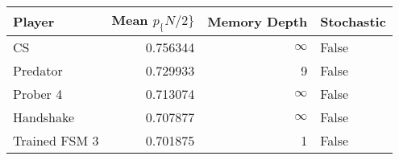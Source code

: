\begin{tabular}{lrrl}
\toprule
        Player &  Mean $p_\{N/2\}$ &  Memory Depth & Stochastic \\
\midrule
            CS &        0.756344 &            \(\infty\) &      False \\
      Predator &        0.729933 &             9 &      False \\
      Prober 4 &        0.713074 &            \(\infty\) &      False \\
     Handshake &        0.707877 &            \(\infty\) &      False \\
 Trained FSM 3 &        0.701875 &             1 &      False \\
\bottomrule
\end{tabular}
